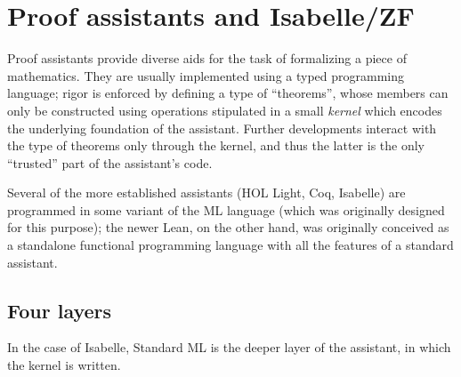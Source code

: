 \section{Proof assistants and Isabelle/ZF}
\label{sec:proof-assist-isabelle}

Proof assistants provide diverse aids for the task
of formalizing a piece of mathematics. They are usually implemented
using a typed programming language; rigor is enforced by defining a
type of ``theorems'', whose members can only be constructed using
operations stipulated in a small \emph{kernel} which encodes the
underlying foundation of the assistant. Further developments interact
with the type of theorems only through the kernel, and thus the latter
is the only ``trusted'' part of the assistant's code.

Several of the more established assistants (HOL Light, Coq, Isabelle)
are programmed in some variant of the ML language (which was
originally designed for this purpose); the newer Lean, on the other
hand, was originally conceived as a standalone functional programming
language with all the features of a standard assistant.

\subsection{Four layers}

In the case of Isabelle, Standard ML is the deeper layer of the
assistant, in which the kernel is written. 


